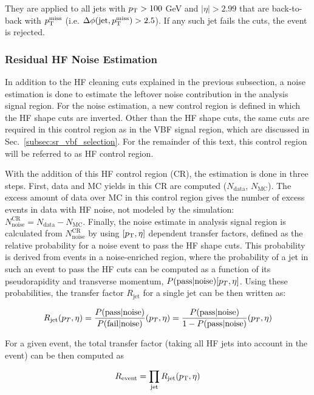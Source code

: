 They are applied to all jets with $p_{\textrm{T}} > 100$ GeV and $|\eta| > 2.99$ that are back-to-back with $p_{\textrm{T}}^{\textrm{miss}}$
(i.e. $\Delta\phi(\textrm{jet},p_{\textrm{T}}^{\textrm{miss}}) > 2.5$). If any such jet fails the cuts, the event is rejected. 


\subsubsection{Residual HF Noise Estimation}
\label{subsubsec:hf_noise_est}

In addition to the HF cleaning cuts explained in the previous subsection,
a noise estimation is done to estimate the leftover noise contribution in  
the analysis signal region. For the noise estimation, a new control region is defined
in which the HF shape cuts are inverted. Other than the HF shape cuts,
the same cuts are required in this control region as in the VBF signal region, which are
discussed in Sec.~\ref{subsec:sr_vbf_selection}. For the remainder of this text, this control
region will be referred to as HF control region.

With the addition of this HF control region (CR), the estimation is done in three steps.
First, data and MC yields in this CR are computed ($N_{\textrm{data}}$, $N_{\textrm{MC}}$). The excess amount of data over MC 
in this control region gives the number of excess events in data with HF noise, not modeled by the 
simulation: $N_{\textrm{noise}}^{\textrm{CR}} = N_{\textrm{data}} - N_{\textrm{MC}}$. 
Finally, the noise estimate in analysis signal region is calculated from $N_{\textrm{noise}}^{\textrm{CR}}$ by using $[p_{\textrm{T}}, \eta]$ dependent transfer factors,
defined as the relative probability for a noise event to pass the HF shape cuts.
This probability is derived from events in a noise-enriched region, where the probability of a jet in such an event
to pass the HF cuts can be computed as a function of its pseudorapidity and transverse momentum, $P( \text{pass} | \text{noise} )[p_{T}, \eta]$.
Using these probabilities, the transfer factor $R_{\textrm{jet}}$ for a single jet can be then written as:

\begin{equation}
    R_{\textrm{jet}} (p_T, \eta) = \frac{P( \text{pass} | \text{noise} )}{P( \text{fail} | \text{noise} )} (p_T, \eta) = \frac{P( \text{pass} | \text{noise} )}{1 - P( \text{pass} | \text{noise} )} (p_T, \eta)
\end{equation}

For a given event, the total transfer factor (taking all HF jets into account in the event) can be then computed as

\begin{equation}
    R_{\textrm{event}} = \prod_{\textrm{jet}} R_{\textrm{jet}} (p_{\textrm{T}}, \eta)
\end{equation}

